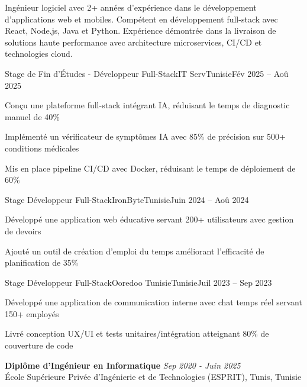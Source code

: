 \documentclass[11pt,a4paper]{article}
\begin{document}
\makecvheader
\makecontactinfo

Ingénieur logiciel avec 2+ années d'expérience dans le développement d'applications web et mobiles. Compétent en développement full-stack avec React, Node.js, Java et Python. Expérience démontrée dans la livraison de solutions haute performance avec architecture microservices, CI/CD et technologies cloud.


\begin{internship}{Stage de Fin d'Études - Développeur Full-Stack}{IT Serv}{Tunisie}{Fév 2025 -- Aoû 2025}{}
  \item Conçu une plateforme full-stack intégrant IA, réduisant le temps de diagnostic manuel de 40\%
  \item Implémenté un vérificateur de symptômes IA avec 85\% de précision sur 500+ conditions médicales
  \item Mis en place pipeline CI/CD avec Docker, réduisant le temps de déploiement de 60\%
\end{internship}

\begin{internship}{Stage Développeur Full-Stack}{IronByte}{Tunisie}{Juin 2024 -- Aoû 2024}{}
  \item Développé une application web éducative servant 200+ utilisateurs avec gestion de devoirs
  \item Ajouté un outil de création d'emploi du temps améliorant l'efficacité de planification de 35\%
\end{internship}

\begin{internship}{Stage Développeur Full-Stack}{Ooredoo Tunisie}{Tunisie}{Juil 2023 -- Sep 2023}{}
  \item Développé une application de communication interne avec chat temps réel servant 150+ employés
  \item Livré conception UX/UI et tests unitaires/intégration atteignant 80\% de couverture de code
\end{internship}

\textbf{Diplôme d'Ingénieur en Informatique} \hfill \textit{Sep 2020 - Juin 2025}\\[-2pt]
École Supérieure Privée d'Ingénierie et de Technologies (ESPRIT), Tunis, Tunisie
\end{document}
